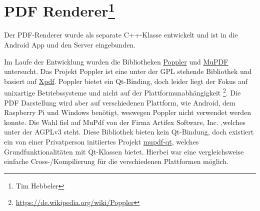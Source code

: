 \chapter[PDF Renderer]{PDF Renderer\footnote{Tim Hebbeler}}
\thispagestyle{fancy}

Der PDF-Renderer wurde als separate C++-Klasse entwickelt und ist in die Android App und den Server eingebunden.

Im Laufe der Entwicklung wurden die Bibliotheken \href{https://poppler.freedesktop.org/}{Poppler} und \href{http://mupdf.com/}{MuPDF} untersucht. Das Projekt Poppler ist eine unter der GPL stehende Bibliothek und basiert auf \href{https://de.wikipedia.org/wiki/Xpdf}{Xpdf}. Poppler bietet ein Qt-Binding, doch leider liegt der Fokus auf unixartige Betriebssysteme und nicht auf der Plattformunabhängigkeit \footnote{\url{https://de.wikipedia.org/wiki/Poppler}}. Die PDF Darstellung wird aber auf verschiedenen Plattform, wie Android, dem Raspberry Pi und Windows benötigt, weswegen Poppler nicht verwendet werden konnte.
Die Wahl fiel auf MuPdf von der Firma Artifex Software, Inc. ,welches unter der AGPLv3 steht. Diese Bibliothek bieten kein Qt-Bindung, doch existiert ein von einer Privatperson initiiertes Projekt \href{https://github.com/xiangxw/mupdf-qt}{mupdf-qt}, welches Grundfunktionalitäten mit Qt-Klassen bietet. Hierbei war eine vergleichsweise einfache Cross-/Kompilierung für die verschiedenen Plattformen möglich.

